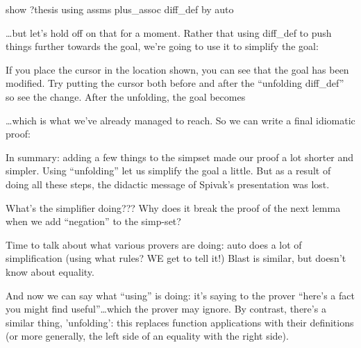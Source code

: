  show ?thesis using  assms plus_assoc  diff_def by auto

\ldots but let's hold off on that for a moment. Rather that using diff_def to push things further towards the goal, we're going to use it to simplify the goal:


If you place the cursor in the location shown, you can see that the goal has been modified. Try putting the cursor both before and after the ``unfolding diff_def'' so see the change. After the unfolding, the goal becomes 

\ldots which is what we've already managed to reach. So we can write a final idiomatic proof:


In summary: adding a few things to the simpset made our proof a lot shorter and simpler. Using ``unfolding'' let us simplify the goal a little. But as a result of doing all these steps, the didactic message of Spivak's presentation was lost. 


What's the simplifier doing???
Why does it break the proof of the next lemma when we add ``negation'' to the simp-set? 

Time to talk about what various provers are doing: auto does a lot of simplification (using what rules? WE get to tell it!) Blast is similar, but doesn't know about equality. 

And now we can say what ``using'' is doing: it's saying to the prover ``here's a fact you might find useful''\ldots which the prover may ignore. By contrast, there's a similar thing, 'unfolding': this replaces function applications with their definitions (or more generally, the left side of an equality with the right side). 
